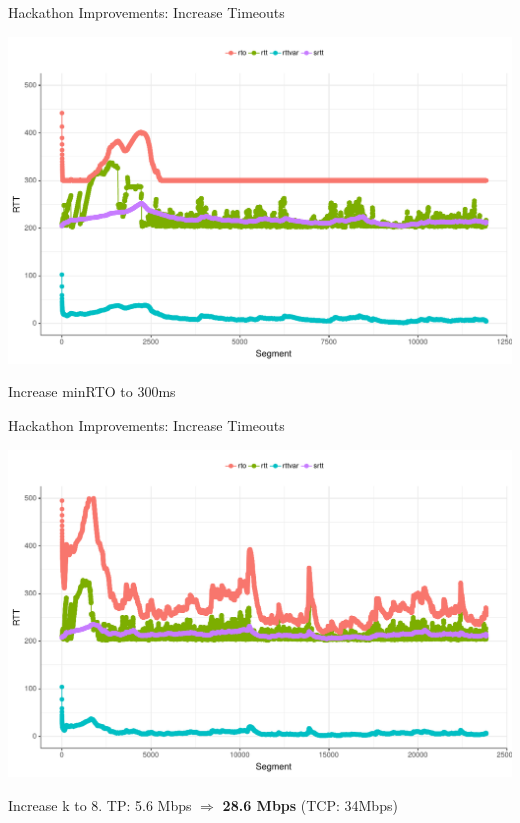 \begin{frame}[fragile]{Hackathon Improvements: Increase Timeouts }

\includegraphics[width=\linewidth]{images/rtt_rto300ms.pdf}

Increase minRTO to 300ms

\end{frame}


\begin{frame}[fragile]{Hackathon Improvements: Increase Timeouts }

\includegraphics[width=\linewidth]{images/rtt_k8.pdf}

Increase k to 8. 
TP:  5.6 Mbps $\Rightarrow$ \textbf{28.6 Mbps} (TCP: 34Mbps)

\end{frame}



